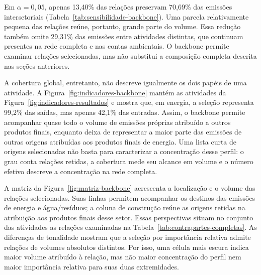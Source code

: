 Em $\alpha=0{,}05$, apenas 13,40\% das relações preservam 70,69\% das emissões intersetoriais (Tabela~\ref{tab:sensibilidade-backbone}). Uma parcela relativamente pequena das relações reúne, portanto, grande parte do volume. Essa redução também omite 29,31\% das emissões entre atividades distintas, que continuam presentes na rede completa e nas contas ambientais. O backbone permite examinar relações selecionadas, mas não substitui a composição completa descrita nas seções anteriores.

A cobertura global, entretanto, não descreve igualmente os dois papéis de uma atividade. A Figura~\ref{fig:indicadores-backbone} mantém as atividades da Figura~\ref{fig:indicadores-resultados} e mostra que, em energia, a seleção representa 99,2\% das saídas, mas apenas 42,1\% das entradas. Assim, o backbone permite acompanhar quase todo o volume de emissões próprias atribuído a outros produtos finais, enquanto deixa de representar a maior parte das emissões de outras origens atribuídas aos produtos finais de energia. Uma lista curta de origens selecionadas não basta para caracterizar a concentração desse perfil: o grau conta relações retidas, a cobertura mede seu alcance em volume e o número efetivo descreve a concentração na rede completa.

A matriz da Figura~\ref{fig:matriz-backbone} acrescenta a localização e o volume das relações selecionadas. Suas linhas permitem acompanhar os destinos das emissões de energia e água/resíduos; a coluna de construção reúne as origens retidas na atribuição aos produtos finais desse setor. Essas perspectivas situam no conjunto das atividades as relações examinadas na Tabela~\ref{tab:contrapartes-completas}. As diferenças de tonalidade mostram que a seleção por importância relativa admite relações de volumes absolutos distintos. Por isso, uma célula mais escura indica maior volume atribuído à relação, mas não maior concentração do perfil nem maior importância relativa para suas duas extremidades.

